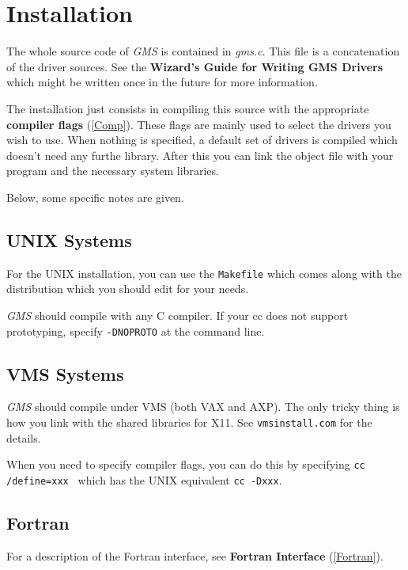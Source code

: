 \section{Installation\label{Installation}}The whole source code of {\em GMS\/}  is contained in
{\em gms.c\/}. This file is a concatenation of  the 
driver sources.
See the
{\bf Wizard's Guide for Writing GMS Drivers}
 which 
might be written once in the future for more information.

The installation just consists in compiling this source
with the appropriate 
{\bf compiler flags} (\ref{Comp}).
These flags are mainly used to select the drivers you wish to use.
When nothing is specified, a default set of drivers is compiled
which doesn't need any furthe library.
After this you can link the object file with your program and
the necessary system libraries.

Below, some specific notes are given.




\subsection{UNIX Systems\label{UNIXSystems}}For the UNIX installation, you can use the {\tt Makefile} which 
comes along with the distribution which you should edit  for your needs.

{\em GMS\/} should compile with any C compiler.
If your cc does not support prototyping, specify {\tt -DNOPROTO}
at the command line.




\subsection{VMS Systems\label{VMSSystems}}{\em GMS\/} should compile under VMS (both VAX and AXP).
The only tricky thing is how you link with the shared libraries for X11.
See {\tt vmsinstall.com} for the details.

When you need to specify compiler flags, you can do this by
specifying {\tt cc /define=xxx } which has the UNIX
equivalent {\tt cc -Dxxx}.




\subsection{Fortran\label{instFortran}}For a description of the Fortran interface, see 
{\bf Fortran Interface} (\ref{Fortran}).

